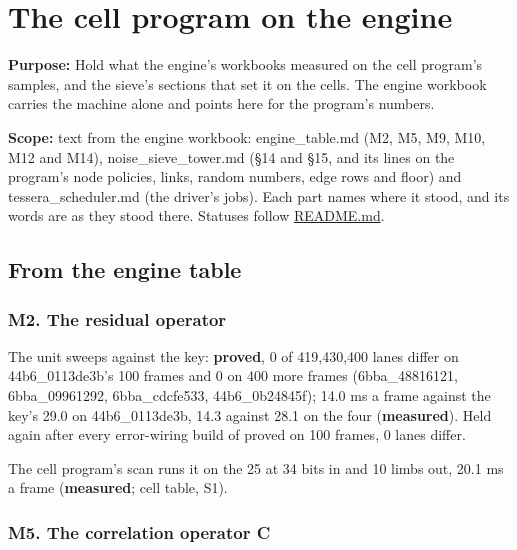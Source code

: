 \chapter{\texorpdfstring{The cell program on the engine}{The cell program on the engine}}
\label{chap:on-the-engine}

\textbf{Purpose:} Hold what the engine's workbooks measured on the cell program's samples, and the sieve's sections that set it on the cells. The engine workbook carries the machine alone and points here for the program's numbers.

\textbf{Scope:} text from the engine workbook: engine\_\allowbreak{}table.md (M2, M5, M9, M10, M12 and M14), noise\_\allowbreak{}sieve\_\allowbreak{}tower.md (§14 and §15, and its lines on the program's node policies, links, random numbers, edge rows and floor) and tessera\_\allowbreak{}scheduler.md (the driver's jobs). Each part names where it stood, and its words are as they stood there. Statuses follow \hyperref[chap:readme]{README.md}.

\section{\texorpdfstring{From the engine table}{From the engine table}}

\subsection{\texorpdfstring{M2. The residual operator}{M2. The residual operator}}

The unit sweeps against the key: \textbf{proved}, 0 of 419,430,400 lanes differ on 44b6\_\allowbreak{}0113de3b's 100 frames and 0 on 400 more frames (6bba\_\allowbreak{}48816121, 6bba\_\allowbreak{}09961292, 6bba\_\allowbreak{}cdcfe533, 44b6\_\allowbreak{}0b24845f); 14.0 ms a frame against the key's 29.0 on 44b6\_\allowbreak{}0113de3b, 14.3 against 28.1 on the four (\textbf{measured}). Held again after every error-wiring build of proved on 100 frames, 0 lanes differ.

The cell program's scan runs it on the 25 at 34 bits in and 10 limbs out, 20.1 ms a frame (\textbf{measured}; cell table, S1).

\subsection{\texorpdfstring{M5. The correlation operator C}{M5. The correlation operator C}}

